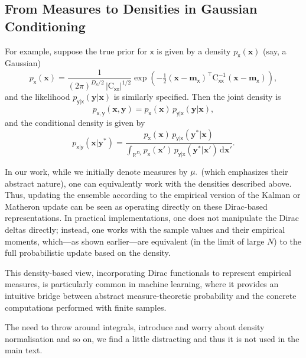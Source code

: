 \documentclass[wcp]{jmlr} %
\newcommand{\vv}[1]{\boldsymbol{#1}}
\newcommand{\mm}[1]{\mathrm{#1}}
\newcommand{\rv}[1]{\mathsf{#1}}
\newcommand{\vrv}[1]{\vv{\rv{#1}}}
\begin{document}
\subsection*{From Measures to Densities in Gaussian Conditioning}

For example, suppose the true prior for \(\vrv{x}\) is given by a density \(p_{\vrv{x}}(\vv{x})\) (say, a Gaussian)
\[
    p_{\vrv{x}}(\vv{x}) = \frac{1}{(2\pi)^{D_{\vrv{x}}/2} \,|\mm{C}_{\vrv{xx}}|^{1/2}} \exp\!\left(-\tfrac{1}{2}(\vv{x}-\vv{m}_{\vrv{x}})^\top \mm{C}_{\vrv{xx}}^{-1} (\vv{x}-\vv{m}_{\vrv{x}})\right),
\]
and the likelihood \(p_{\vrv{y}|\vrv{x}}(\vv{y}|\vv{x})\) is similarly specified. Then the joint density is
\begin{equation}
    p_{\vrv{x},\vrv{y}}(\vv{x},\vv{y})
    = p_{\vrv{x}}(\vv{x})\,p_{\vrv{y}|\vrv{x}}(\vv{y}|\vv{x}),
\end{equation}
and the conditional density is given by
\begin{equation}
    p_{\vrv{x}|\vrv{y}}(\vv{x}|\vv{y}^*)
    = \frac{p_{\vrv{x}}(\vv{x})\,p_{\vrv{y}|\vrv{x}}(\vv{y}^*|\vv{x})}{\int_{\mathbb{R}^{D_{\vrv{x}}}} p_{\vrv{x}}(\vv{x}')\,p_{\vrv{y}|\vrv{x}}(\vv{y}^*|\vv{x}')\,\mathrm{d}\vv{x}'}.
\end{equation}

In our work, while we initially denote measures by \(\Law[\cdot]\) (which emphasizes their abstract nature), one can equivalently work with the densities described above.
Thus, updating the ensemble according to the empirical version of the Kalman or Matheron update can be seen as operating directly on these Dirac-based representations.
In practical implementations, one does not manipulate the Dirac deltas directly; instead, one works with the sample values and their empirical moments, which—as shown earlier—are equivalent (in the limit of large \(N\)) to the full probabilistic update based on the density.

This density-based view, incorporating Dirac functionals to represent empirical measures, is particularly common in machine learning, where it provides an intuitive bridge between abstract measure-theoretic probability and the concrete computations performed with finite samples.

The need to throw around integrals, introduce and worry about density normalisation and so on, we find a little distracting and thus it is not used in the main text.


\end{document}
